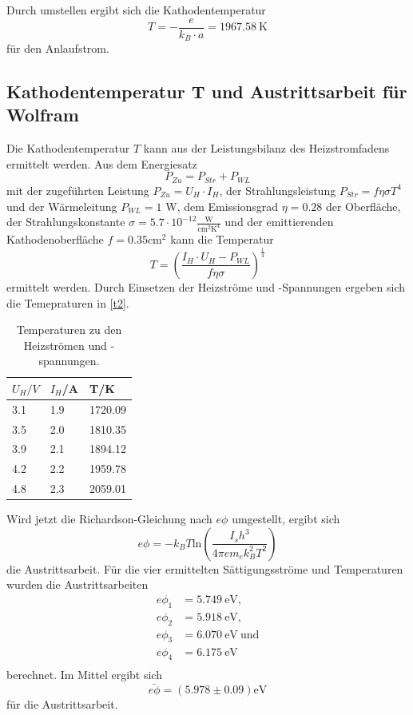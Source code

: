  Durch umstellen ergibt sich die Kathodentemperatur 
 \begin{equation*}
   T=-\frac{e}{k_{B}\cdot a}=1967.58\ \textrm{K}
 \end{equation*}
 für den Anlaufstrom. 

 \subsection{Kathodentemperatur T und Austrittsarbeit für Wolfram}
 Die Kathodentemperatur $T$ kann aus der Leistungsbilanz des Heizstromfadens ermittelt werden. Aus dem Energiesatz 
 \begin{equation*}
   P_{Zu}=P_{Str}+P_{WL}
 \end{equation*}
 mit der zugeführten Leistung $P_{Zu}=U_{H}\cdot I_{H}$, der Strahlungsleistung $P_{Str}=f\eta\sigma T^4$ und der Wärmeleitung $P_{WL}=1$ W, dem Emissionsgrad $\eta=0.28$ der Oberfläche, der Strahlungskonstante $\sigma=5.7\cdot 10^{-12} \frac{\textrm{W}}{\textrm{cm}^2\textrm{K}^4}$ und der emittierenden Kathodenoberfläche $f=0.35 \textrm{cm}^2$  kann die Temperatur
 \begin{equation*}
   T=\left(\frac{I_{H}\cdot U_{H}-P_{WL}}{f\eta\sigma}\right)^{\frac{1}{4}}
 \end{equation*}
 ermittelt werden. Durch Einsetzen der Heizströme und -Spannungen ergeben sich die Temepraturen in \autoref{t2}.
 \begin{table}[H]
 \centering
 \caption{Temperaturen zu den Heizströmen und -spannungen.}
 \begin{tabular}{l|l|l}
 $U_{H}/V$ & $I_{H}$/A & T/K\\ \hline
 3.1 & 1.9 & 1720.09\\
 3.5 & 2.0 & 1810.35\\
 3.9 & 2.1 & 1894.12\\
 4.2 & 2.2 & 1959.78\\
 4.8 & 2.3 & 2059.01
 \end{tabular}
 \label{t2}
 \end{table}
 Wird jetzt die Richardson-Gleichung nach $e\phi$ umgestellt, ergibt sich 
 \begin{equation*}
 e\phi=-k_{B}T\textrm{ln}(\frac{I_{s}h^3}{4\pi em_{e}k_{B}^2T^2})
 \end{equation*}
 die Austrittsarbeit. Für die vier ermittelten Sättigungsströme und Temperaturen wurden die Austrittsarbeiten 
 \begin{align*}
   e\phi_{1}&=5.749\ \textrm{eV},\\
   e\phi_{2}&=5.918\ \textrm{eV},\\
   e\phi_{3}&=6.070\ \textrm{eV}\ \textrm{und}\\
   e\phi_{4}&=6.175\ \textrm{eV}\\
 \end{align*}
 berechnet. Im Mittel ergibt sich 
 \begin{equation*}
   \bar{e\phi}=(5.978 \pm 0.09) \textrm{eV}
 \end{equation*}
für die Austrittsarbeit.

